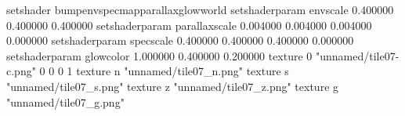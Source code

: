 setshader bumpenvspecmapparallaxglowworld
setshaderparam envscale 0.400000 0.400000 0.400000
setshaderparam parallaxscale 0.004000 0.004000 0.004000 0.000000
setshaderparam specscale 0.400000 0.400000 0.400000 0.000000
setshaderparam glowcolor 1.000000 0.400000 0.200000
texture 0 "unnamed/tile07-c.png" 0 0 0 1
texture n "unnamed/tile07_n.png"
texture s "unnamed/tile07_s.png"
texture z "unnamed/tile07_z.png"
texture g "unnamed/tile07_g.png"